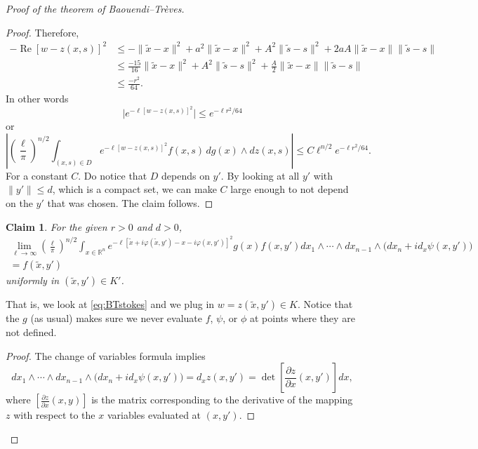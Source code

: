 \documentclass[12pt,openany]{book}
\renewcommand{\Re}{\operatorname{Re}}
\newcommand{\snorm}[1]{\lVert {#1} \rVert}
\newcommand{\babs}[1]{\bigl\lvert {#1} \bigr\rvert}
\newcommand{\abs}[1]{\left\lvert {#1} \right\rvert}
\newcommand{\R}{{\mathbb{R}}}
\theoremstyle{plain}
\newtheorem{claim}[thm]{Claim}
\theoremstyle{remark}
\theoremstyle{definition}
\theoremstyle{exercise}
\theoremstyle{example}
\begin{document}
\begin{proof}[Proof of the theorem of Baouendi--Tr{\`e}ves]
\begin{proof}
Therefore,
\begin{equation*}
\begin{split}
-\Re {[w - z(x,s)]}^2 & \leq
- \snorm{\tilde{x}-x}^2
+
a^2 \snorm{\tilde{x}-x}^2
+
A^2 \snorm{\tilde{s}-s}^2
+
2aA \snorm{\tilde{x}-x}\snorm{\tilde{s}-s}
\\
& \leq
\frac{-15}{16} \snorm{\tilde{x}-x}^2
+
A^2 \snorm{\tilde{s}-s}^2
+
\frac{A}{2} \snorm{\tilde{x}-x}\snorm{\tilde{s}-s}
\\
& \leq \frac{-r^2}{64} .
\end{split}
\end{equation*}
In other words
\begin{equation*}
\babs{
e^{-\ell[w-z(x,s)]^2}}
\leq
e^{-\ell r^2  / 64}
\end{equation*}
or
\begin{equation*}
\abs{
{\left(\frac{\ell}{\pi}\right)}^{n/2}
\int_{(x,s)\in D}
e^{-\ell [w - z(x,s)]^2} f(x,s)
\,
dg(x) 
\wedge
dz(x,s)
}
\leq
C
\ell^{n/2}
e^{-\ell r^2  / 64} .
\end{equation*}
For a constant $C$.  Do notice that $D$ depends on $y'$.  By looking at all
$y'$ with $\snorm{y'} \leq d$, which
is a compact set, we can make $C$
large enough to not depend on the $y'$ that was chosen.
The claim follows.
\end{proof}

\begin{claim}
For the given $r>0$ and $d>0$,
\begin{multline*}
\lim_{\ell\to\infty}
{\left(\frac{\ell}{\pi}\right)}^{n/2}
\int_{x \in \R^n}
e^{  -\ell [\tilde{x}+i\varphi(\tilde{x},y') - x-i\varphi(x,y')]^2 } g(x) f(x,y')
dx_1  \wedge
\cdots \wedge
dx_{n-1}
\wedge
\bigl(dx_{n} + i d_x \psi (x,y') \bigr) 
\\
= f(\tilde{x},y')
\end{multline*}
uniformly in $(\tilde{x},y') \in K'$.
\end{claim}

That is, we look at \eqref{eq:BTstokes} and we plug in $w = z(\tilde{x},y') \in K$.
Notice that the $g$ (as usual) makes sure we never evaluate $f$, $\psi$, or
$\phi$ at
points where they are not defined.

\begin{proof}
The change of variables formula implies
\begin{equation*}
dx_1  \wedge
\cdots \wedge
dx_{n-1}
\wedge
\bigl(dx_{n} + i d_x \psi (x,y') \bigr) 
=
d_x z(x,y')
=
\det \left[\frac{\partial z}{\partial x}(x,y')\right] dx ,
\end{equation*}
where $\left[\frac{\partial z}{\partial x}(x,y)\right]$ is the matrix
corresponding to the derivative of the mapping $z$ with respect to the $x$
variables evaluated at $(x,y')$.


\end{proof}
\end{proof}
\end{document}
